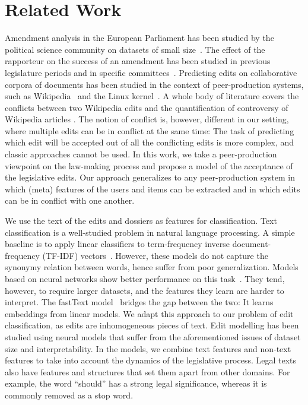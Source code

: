 \section{Related Work}
\label{lmp:sec:relwork}

Amendment analysis in the European Parliament has been studied by the political science community on datasets of small size~\cite{kreppel1999affects,tsebelis2001legislative,kreppel2002moving,baller2017specialists}.
The effect of the rapporteur on the success of an amendment has been studied in previous legislature periods and in specific committees~\cite{finke2012proposal,hurka2013changing}.
Predicting edits on collaborative corpora of documents has been studied in the context of peer-production systems, such as Wikipedia~\cite{druck2008learning,adler2007content,sarkar2019stre} and the Linux kernel~\cite{jiang2013will,yardim2018can}.
A whole body of literature covers the conflicts between two Wikipedia edits \cite{sumi2011edit,yasseri2012dynamics} and the quantification of controversy of Wikipedia articles \cite{sepehri2012leveraging,rad2012identifying}.
The notion of conflict is, however, different in our setting, where multiple edits can be in conflict at the same time:
The task of predicting which edit will be accepted out of all the conflicting edits is more complex, and classic approaches cannot be used.
In this work, we take a peer-production viewpoint on the law-making process and propose a model of the acceptance of the legislative edits.
Our approach generalizes to any peer-production system in which (meta) features of the users and items can be extracted and in which edits can be in conflict with one another.

We use the text of the edits and dossiers as features for classification.
Text classification is a well-studied problem in natural language processing.
A simple baseline is to apply linear classifiers to term-frequency inverse document-frequency (TF-IDF) vectors~\cite{joachims1998text}.
However, these models do not capture the synonymy relation between words, hence suffer from poor generalization.
Models based on neural networks show better performance on this task~\cite{zhang2015character}.
They tend, however, to require larger datasets, and the features they learn are harder to interpret.
The fastText model~\cite{joulin2017bag} bridges the gap between the two:
It learns embeddings from linear models.
We adapt this approach to our problem of edit classification, as edits are inhomogeneous pieces of text.
Edit modelling has been studied using neural models\cite{yin2018learning,guu2018generating} that suffer from the aforementioned issues of dataset size and interpretability.
In the \warofwords{} models, we combine text features and non-text features to take into account the dynamics of the legislative process.
Legal texts also have features and structures that set them apart from other domains.
For example, the word ``should'' has a strong legal significance, whereas it is commonly removed as a stop word.

